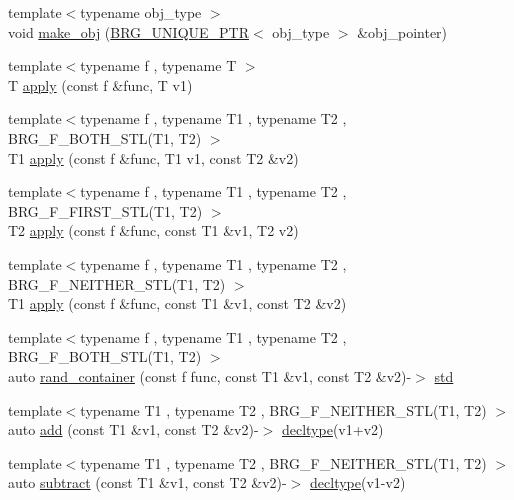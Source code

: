 \begin{DoxyCompactItemize}
\item 
{\footnotesize template$<$typename obj\-\_\-type $>$ }\\void \hyperlink{namespaceIceBRG_ab7e2d18e0bff491788b46ca3720ea674}{make\-\_\-obj} (\hyperlink{lib_2IceBRG__main_2common_8h_a14fca7a819f4969aaf506478b426c11d}{B\-R\-G\-\_\-\-U\-N\-I\-Q\-U\-E\-\_\-\-P\-T\-R}$<$ obj\-\_\-type $>$ \&obj\-\_\-pointer)
\item 
{\footnotesize template$<$typename f , typename T $>$ }\\T \hyperlink{namespaceIceBRG_a64188b3b7eac4a6e5a45251eeeae4b29}{apply} (const f \&func, T v1)
\item 
{\footnotesize template$<$typename f , typename T1 , typename T2 , B\-R\-G\-\_\-\-F\-\_\-\-B\-O\-T\-H\-\_\-\-S\-T\-L(\-T1, T2) $>$ }\\T1 \hyperlink{namespaceIceBRG_afdee92c19500126c2295f1a37fa56b41}{apply} (const f \&func, T1 v1, const T2 \&v2)
\item 
{\footnotesize template$<$typename f , typename T1 , typename T2 , B\-R\-G\-\_\-\-F\-\_\-\-F\-I\-R\-S\-T\-\_\-\-S\-T\-L(\-T1, T2) $>$ }\\T2 \hyperlink{namespaceIceBRG_a7e4010db72267b0919f514be5eaf68c0}{apply} (const f \&func, const T1 \&v1, T2 v2)
\item 
{\footnotesize template$<$typename f , typename T1 , typename T2 , B\-R\-G\-\_\-\-F\-\_\-\-N\-E\-I\-T\-H\-E\-R\-\_\-\-S\-T\-L(\-T1, T2) $>$ }\\T1 \hyperlink{namespaceIceBRG_a171e97e6b0cf6304cdec912e18c091fa}{apply} (const f \&func, const T1 \&v1, const T2 \&v2)
\item 
{\footnotesize template$<$typename f , typename T1 , typename T2 , B\-R\-G\-\_\-\-F\-\_\-\-B\-O\-T\-H\-\_\-\-S\-T\-L(\-T1, T2) $>$ }\\auto \hyperlink{namespaceIceBRG_ad9269218a7f4352e6c289180d8cb2ff8}{rand\-\_\-container} (const f func, const T1 \&v1, const T2 \&v2)-\/$>$ \hyperlink{namespaceIceBRG_a97e1636544e3bdcfc71f53292e1c3df3}{std}
\item 
{\footnotesize template$<$typename T1 , typename T2 , B\-R\-G\-\_\-\-F\-\_\-\-N\-E\-I\-T\-H\-E\-R\-\_\-\-S\-T\-L(\-T1, T2) $>$ }\\auto \hyperlink{namespaceIceBRG_a747582ca9173656cbfa4a759b45063a7}{add} (const T1 \&v1, const T2 \&v2)-\/$>$ \hyperlink{namespaceIceBRG_a528e5024ecab03049320529180ae84a8}{decltype}(v1+v2)
\item 
{\footnotesize template$<$typename T1 , typename T2 , B\-R\-G\-\_\-\-F\-\_\-\-N\-E\-I\-T\-H\-E\-R\-\_\-\-S\-T\-L(\-T1, T2) $>$ }\\auto \hyperlink{namespaceIceBRG_a2f797beb05f093c2ab0bf755782b7698}{subtract} (const T1 \&v1, const T2 \&v2)-\/$>$ \hyperlink{namespaceIceBRG_a528e5024ecab03049320529180ae84a8}{decltype}(v1-\/v2)

\end{DoxyCompactItemize}
